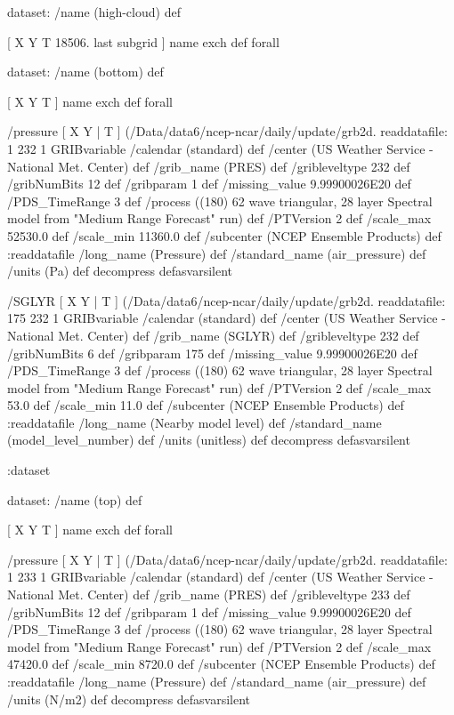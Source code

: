 \begin{ingrid}

 dataset: /name (high-cloud) def

  [ X Y T 18506. last subgrid ] { name exch def } forall

  dataset: /name (bottom) def

   [ X Y T ] { name exch def } forall

   /pressure { [ X Y | T ] (/Data/data6/ncep-ncar/daily/update/grb2d.%
   readdatafile:
   1 232 1 GRIBvariable
   /calendar (standard) def
   /center (US Weather Service - National Met. Center) def
   /grib_name (PRES) def
   /gribleveltype 232 def
   /gribNumBits 12 def
   /gribparam 1 def
   /missing_value 9.99900026E20 def
   /PDS_TimeRange 3 def
   /process ((180) 62 wave triangular, 28 layer Spectral model from "Medium Range Forecast" run) def
   /PTVersion 2 def
   /scale_max 52530.0 def
   /scale_min 11360.0 def
   /subcenter (NCEP Ensemble Products) def
   :readdatafile
   /long_name (Pressure) def
   /standard_name (air_pressure) def
   /units (Pa) def
   decompress
   } defasvarsilent

   /SGLYR { [ X Y | T ] (/Data/data6/ncep-ncar/daily/update/grb2d.%
   readdatafile:
   175 232 1 GRIBvariable
   /calendar (standard) def
   /center (US Weather Service - National Met. Center) def
   /grib_name (SGLYR) def
   /gribleveltype 232 def
   /gribNumBits 6 def
   /gribparam 175 def
   /missing_value 9.99900026E20 def
   /PDS_TimeRange 3 def
   /process ((180) 62 wave triangular, 28 layer Spectral model from "Medium Range Forecast" run) def
   /PTVersion 2 def
   /scale_max 53.0 def
   /scale_min 11.0 def
   /subcenter (NCEP Ensemble Products) def
   :readdatafile
   /long_name (Nearby model level) def
   /standard_name (model_level_number) def
   /units (unitless) def
   decompress
   } defasvarsilent

  :dataset

  dataset: /name (top) def

   [ X Y T ] { name exch def } forall

   /pressure { [ X Y | T ] (/Data/data6/ncep-ncar/daily/update/grb2d.%
   readdatafile:
   1 233 1 GRIBvariable
   /calendar (standard) def
   /center (US Weather Service - National Met. Center) def
   /grib_name (PRES) def
   /gribleveltype 233 def
   /gribNumBits 12 def
   /gribparam 1 def
   /missing_value 9.99900026E20 def
   /PDS_TimeRange 3 def
   /process ((180) 62 wave triangular, 28 layer Spectral model from "Medium Range Forecast" run) def
   /PTVersion 2 def
   /scale_max 47420.0 def
   /scale_min 8720.0 def
   /subcenter (NCEP Ensemble Products) def
   :readdatafile
   /long_name (Pressure) def
   /standard_name (air_pressure) def
   /units (N/m2) def
   decompress
   } defasvarsilent


\end{ingrid}
